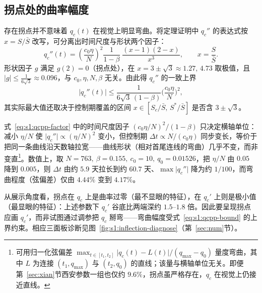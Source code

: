 \documentclass[lang=cn,a4paper,newtx]{elegantpaper}
\numberwithin{equation}{section}
\theoremstyle{plain}
\begin{document}
\subsection{拐点处的曲率幅度}
\label{sec:s1:inflection-curvature}
存在拐点并不意味着 $q_c(t)$ 在视觉上明显弯曲。将定理证明中 $q_c''$ 的表达式按 $x=S/\bar S$ 改写，可分离出时间尺度与形状两个因子：
\begin{equation}
q_c''(t)=\left(\frac{c_0\eta}{N}\right)^{2}\frac{1}{1-\beta}\;\frac{(x-1)(2-x)}{x^{3}},\qquad x=\frac{S}{\bar S}.
\label{eq:s1:qcpp-factor}
\end{equation}
形状因子 $g$ 满足 $g(2)=0$（拐点处），在 $x=3\pm\sqrt3\approx1.27,\,4.73$ 取极值，且 $|g|\le\frac{1}{6\sqrt3}\approx0.096$，与 $c_0,\eta,N,\beta$ 无关。由此得 $q_c''$ 的一致上界
\begin{equation}
\lvert q_c''(t)\rvert\le\frac{1}{6\sqrt3\,(1-\beta)}\Big(\frac{c_0\eta}{N}\Big)^{2},
\label{eq:s1:qcpp-bound}
\end{equation}
其实际最大值还取决于控制期覆盖的区间 $x\in[S_c/\bar S,\,S^*/\bar S]$ 是否含 $3\pm\sqrt3$。

式~\eqref{eq:s1:qcpp-factor} 中的时间尺度因子 $(c_0\eta/N)^2/(1-\beta)$ 只决定横轴单位：减小 $\eta/N$ 使 $\lvert q_c''\rvert\propto(\eta/N)^2$ 变小，但控制期 $\Delta t\propto N/(c_0\eta)$ 同步变长，等价于把同一条曲线沿天数轴拉宽——曲线形状（相对首尾连线的弯曲）几乎不变，而非变直\footnote{可用归一化弦偏差 $\max_{t\in[t_1,t_2]}\lvert q_c(t)-L(t)\rvert/(q_{\max}-q_0)$ 量度弯曲，其中 $L$ 为连接 $(t_1,q_{\max})$ 与 $(t_2,q_0)$ 的直线；该量与横轴单位无关。即便第~\ref{sec:xian}节西安参数一组也仅约 $9.6\%$，拐点虽严格存在，$q_c$ 在视觉上仍接近直线。}。数值上，取 $N=763,\ \beta=0.155,\ c_0=10,\ q_0=0.01526$，把 $\eta/N$ 由 $0.05$ 降到 $0.005$，则 $\Delta t$ 由约 $5.9$ 天拉长到约 $60.7$ 天、$\max\lvert q_c''\rvert$ 降为约 $1/100$，而弯曲程度（弦偏差）仅由 $4.44\%$ 变到 $4.17\%$。

从展示角度看，拐点在 $q_c$ 上是曲率过零（最不显眼的特征），在 $q_c'$ 上则是极小值（最显眼的特征）：上述参数下 $q_c'$ 谷底比两端深约 $1.5$--$1.8$ 倍。因此要呈现拐点应画 $q_c'$，而非试图通过调参把 $q_c$ 掰弯——弯曲幅度受式~\eqref{eq:s1:qcpp-bound} 的上界约束。相应三面板诊断见图~\ref{fig:s1:inflection-diagnose}（第~\ref{sec:num}节）。
\end{document}
